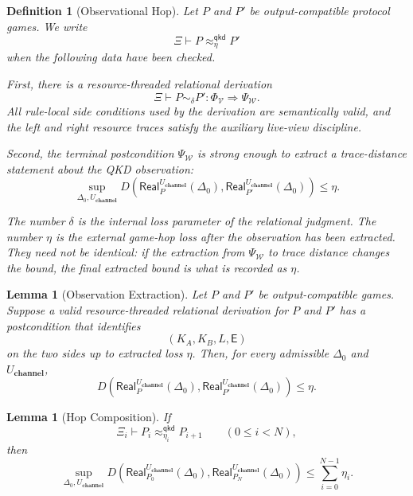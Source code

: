 \documentclass[acmsmall,screen,review,anonymous,nonacm]{acmart}
\newtheorem{definition}{Definition}[section]
\theoremstyle{defn_style}
\newtheorem{lemma}[lem]{Lemma}
\begin{document}
\begin{definition}[Observational Hop]
Let \(P\) and \(P'\) be output-compatible protocol games.  We write
\[
\Xi
\vdash
P
\approx_{\eta}^{\mathsf{qkd}}
P'
\]
when the following data have been checked.

First, there is a resource-threaded relational derivation
\[
\Xi
\vdash
P\sim_{\delta}P'
:
\Phi_{\mathcal V}
\Longrightarrow
\Psi_{\mathcal W}.
\]
All rule-local side conditions used by the derivation are
semantically valid, and the left and right resource traces satisfy the
auxiliary live-view discipline.

Second, the terminal postcondition \(\Psi_{\mathcal W}\) is strong
enough to extract a trace-distance statement about the QKD observation:
\[
\sup_{\Delta_0,U_{\textbf{channel}}}
D\left(
\mathsf{Real}_{P}^{U_{\textbf{channel}}}(\Delta_0),
\mathsf{Real}_{P'}^{U_{\textbf{channel}}}(\Delta_0)
\right)
\leq
\eta .
\]

The number \(\delta\) is the internal loss parameter of the relational
judgment.  The number \(\eta\) is the external game-hop loss after the observation has been extracted.  They need not be identical:
if the extraction from \(\Psi_{\mathcal W}\) to trace distance changes
the bound, the final extracted bound is what is recorded as \(\eta\).

\end{definition}

\begin{lemma}[Observation Extraction]
Let \(P\) and \(P'\) be output-compatible games.  Suppose a valid
resource-threaded relational derivation for \(P\) and \(P'\) has a postcondition that identifies
\[
(K_A,K_B,L,\mathsf E)
\]
on the two sides up to extracted loss \(\eta\).  Then, for every
admissible \(\Delta_0\) and \(U_{\textbf{channel}}\),
\[
D\left(
\mathsf{Real}_{P}^{U_{\textbf{channel}}}(\Delta_0),
\mathsf{Real}_{P'}^{U_{\textbf{channel}}}(\Delta_0)
\right)
\leq
\eta .
\]
\end{lemma}

\begin{lemma}[Hop Composition]
If
\[
\Xi_i
\vdash
P_i
\approx_{\eta_i}^{\mathsf{qkd}}
P_{i+1}
\qquad
(0\leq i<N),
\]
then
\[
\sup_{\Delta_0,U_{\textbf{channel}}}
D\left(
\mathsf{Real}_{P_0}^{U_{\textbf{channel}}}(\Delta_0),
\mathsf{Real}_{P_N}^{U_{\textbf{channel}}}(\Delta_0)
\right)
\leq
\sum_{i=0}^{N-1}\eta_i .
\]
\end{lemma}
\end{document}
